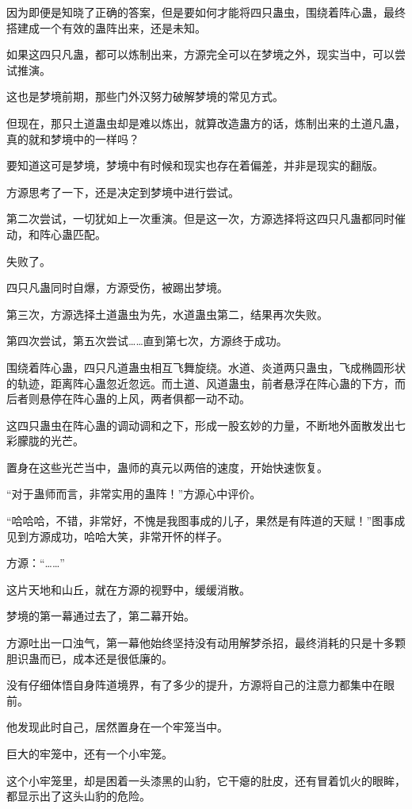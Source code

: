 \begin{this_body}
因为即便是知晓了正确的答案，但是要如何才能将四只蛊虫，围绕着阵心蛊，最终搭建成一个有效的蛊阵出来，还是未知。

如果这四只凡蛊，都可以炼制出来，方源完全可以在梦境之外，现实当中，可以尝试推演。

这也是梦境前期，那些门外汉努力破解梦境的常见方式。

但现在，那只土道蛊虫却是难以炼出，就算改造蛊方的话，炼制出来的土道凡蛊，真的就和梦境中的一样吗？

要知道这可是梦境，梦境中有时候和现实也存在着偏差，并非是现实的翻版。

方源思考了一下，还是决定到梦境中进行尝试。

第二次尝试，一切犹如上一次重演。但是这一次，方源选择将这四只凡蛊都同时催动，和阵心蛊匹配。

失败了。

四只凡蛊同时自爆，方源受伤，被踢出梦境。

第三次，方源选择土道蛊虫为先，水道蛊虫第二，结果再次失败。

第四次尝试，第五次尝试……直到第七次，方源终于成功。

围绕着阵心蛊，四只凡道蛊虫相互飞舞旋绕。水道、炎道两只蛊虫，飞成椭圆形状的轨迹，距离阵心蛊忽近忽远。而土道、风道蛊虫，前者悬浮在阵心蛊的下方，而后者则悬停在阵心蛊的上风，两者俱都一动不动。

这四只蛊虫在阵心蛊的调动调和之下，形成一股玄妙的力量，不断地外面散发出七彩朦胧的光芒。

置身在这些光芒当中，蛊师的真元以两倍的速度，开始快速恢复。

“对于蛊师而言，非常实用的蛊阵！”方源心中评价。

“哈哈哈，不错，非常好，不愧是我图事成的儿子，果然是有阵道的天赋！”图事成见到方源成功，哈哈大笑，非常开怀的样子。

方源：“……”

这片天地和山丘，就在方源的视野中，缓缓消散。

梦境的第一幕通过去了，第二幕开始。

方源吐出一口浊气，第一幕他始终坚持没有动用解梦杀招，最终消耗的只是十多颗胆识蛊而已，成本还是很低廉的。

没有仔细体悟自身阵道境界，有了多少的提升，方源将自己的注意力都集中在眼前。

他发现此时自己，居然置身在一个牢笼当中。

巨大的牢笼中，还有一个小牢笼。

这个小牢笼里，却是困着一头漆黑的山豹，它干瘪的肚皮，还有冒着饥火的眼眸，都显示出了这头山豹的危险。


\end{this_body}
